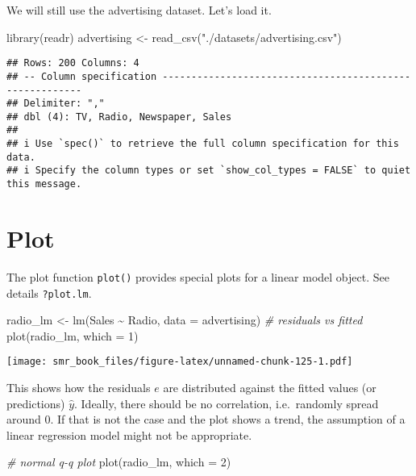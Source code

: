 \documentclass[
  oneside]{book}
\newenvironment{Shaded}{\begin{snugshade}}{\end{snugshade}}
\newcommand{\AttributeTok}[1]{\textcolor[rgb]{0.77,0.63,0.00}{#1}}
\newcommand{\CommentTok}[1]{\textcolor[rgb]{0.56,0.35,0.01}{\textit{#1}}}
\newcommand{\DecValTok}[1]{\textcolor[rgb]{0.00,0.00,0.81}{#1}}
\newcommand{\FunctionTok}[1]{\textcolor[rgb]{0.00,0.00,0.00}{#1}}
\newcommand{\NormalTok}[1]{#1}
\newcommand{\OtherTok}[1]{\textcolor[rgb]{0.56,0.35,0.01}{#1}}
\newcommand{\SpecialCharTok}[1]{\textcolor[rgb]{0.00,0.00,0.00}{#1}}
\newcommand{\StringTok}[1]{\textcolor[rgb]{0.31,0.60,0.02}{#1}}
\begin{document}
We will still use the advertising dataset. Let's load it.

\begin{Shaded}
\begin{Highlighting}[]
\FunctionTok{library}\NormalTok{(readr)}
\NormalTok{advertising }\OtherTok{\textless{}{-}} \FunctionTok{read\_csv}\NormalTok{(}\StringTok{"./datasets/advertising.csv"}\NormalTok{)}
\end{Highlighting}
\end{Shaded}

\begin{verbatim}
## Rows: 200 Columns: 4
## -- Column specification --------------------------------------------------------
## Delimiter: ","
## dbl (4): TV, Radio, Newspaper, Sales
## 
## i Use `spec()` to retrieve the full column specification for this data.
## i Specify the column types or set `show_col_types = FALSE` to quiet this message.
\end{verbatim}

\hypertarget{plot-1}{%
\section{Plot}\label{plot-1}}

The plot function \texttt{plot()} provides special plots for a linear
model object. See details \texttt{?plot.lm}.

\begin{Shaded}
\begin{Highlighting}[]
\NormalTok{radio\_lm }\OtherTok{\textless{}{-}} \FunctionTok{lm}\NormalTok{(Sales }\SpecialCharTok{\textasciitilde{}}\NormalTok{ Radio, }\AttributeTok{data =}\NormalTok{ advertising)}
\CommentTok{\# residuals vs fitted}
\FunctionTok{plot}\NormalTok{(radio\_lm, }\AttributeTok{which =} \DecValTok{1}\NormalTok{)}
\end{Highlighting}
\end{Shaded}

\texttt{[image: smr\_book\_files/figure-latex/unnamed-chunk-125-1.pdf]}

This shows how the residuals \(e\) are distributed against the
fitted values (or predictions) \(\hat{y}\). Ideally, there should
be no correlation, i.e.~randomly spread around 0. If that is not
the case and the plot shows a trend, the assumption of a linear
regression model might not be appropriate.

\begin{Shaded}
\begin{Highlighting}[]
\CommentTok{\# normal q{-}q plot}
\FunctionTok{plot}\NormalTok{(radio\_lm, }\AttributeTok{which =} \DecValTok{2}\NormalTok{)}
\end{Highlighting}
\end{Shaded}
\end{document}

